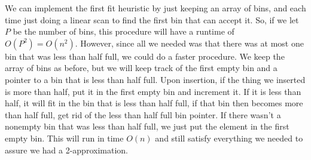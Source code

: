 \documentclass{article}
\begin{document}
\begin{enumerate}[a.]
We can implement the first fit heuristic by just keeping an array of bins, and each time just doing a linear scan to find the first bin that can accept it. So, if we let $P$ be the number of bins, this procedure will have a runtime of $O(P^2) = O(n^2)$. However, since all we needed was that there was at most one bin that was less than half full, we could do a faster procedure. We keep the array of bins as before, but we will keep track of the first empty bin and a pointer to a bin that is less than half full. Upon insertion, if the thing we inserted is more than half, put it in the first empty bin and increment it. If it is less than half, it will fit in the bin that is less than half full, if that bin then becomes more than half full, get rid of the less than half full bin pointer. If there wasn't a nonempty bin that was less than half full, we just put the element in the first empty bin. This will run in time $O(n)$ and still satisfy everything we needed to assure we had a 2-approximation.
\end{enumerate}
\end{document}
